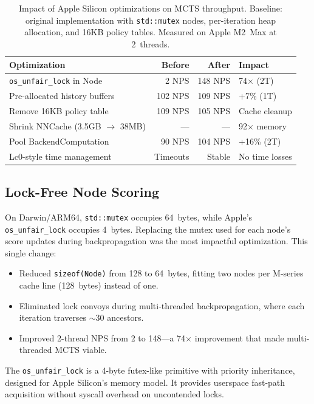 \documentclass{svproc}
\newcommand{\stdmutex}{\texttt{std::\allowbreak mutex}}
\newcommand{\osunfairlock}{\texttt{os\_\allowbreak unfair\_\allowbreak lock}}
\begin{document}
\begin{table}[!htbp]
\centering
\caption{Impact of Apple Silicon optimizations on MCTS throughput. Baseline: original implementation with \texttt{std::mutex} nodes, per-iteration heap allocation, and 16KB policy tables. Measured on Apple M2~Max at 2~threads.}
\label{tab:optimizations}
\begin{tabular}{lrrl}
\toprule
\textbf{Optimization} & \textbf{Before} & \textbf{After} & \textbf{Impact} \\
\midrule
\texttt{os\_unfair\_lock} in Node & 2 NPS & 148 NPS & 74$\times$ (2T) \\
Pre-allocated history buffers & 102 NPS & 109 NPS & +7\% (1T) \\
Remove 16KB policy table & 109 NPS & 105 NPS & Cache cleanup \\
Shrink NNCache (3.5GB $\to$ 38MB) & --- & --- & 92$\times$ memory \\
Pool BackendComputation & 90 NPS & 104 NPS & +16\% (2T) \\
Lc0-style time management & Timeouts & Stable & No time losses \\
\bottomrule
\end{tabular}
\end{table}

\subsection{Lock-Free Node Scoring}

On Darwin/ARM64, \stdmutex{} occupies 64~bytes, while Apple's \osunfairlock{} occupies 4~bytes. Replacing the mutex used for each node's score updates during backpropagation was the most impactful optimization. This single change:

\begin{itemize}
    \item Reduced \texttt{sizeof(Node)} from 128 to 64~bytes, fitting two nodes per M-series cache line (128~bytes) instead of one.
    \item Eliminated lock convoys during multi-threaded backpropagation, where each iteration traverses $\sim$30 ancestors.
    \item Improved 2-thread NPS from 2 to 148---a 74$\times$ improvement that made multi-threaded MCTS viable.
\end{itemize}

The \osunfairlock{} is a 4-byte futex-like primitive with priority inheritance, designed for Apple Silicon's memory model. It provides userspace fast-path acquisition without syscall overhead on uncontended locks.
\end{document}
